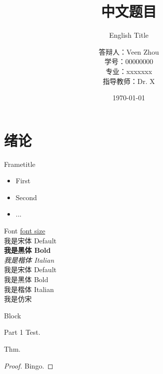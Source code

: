 \documentclass[hyperref,UTF8,11pt,aspectratio=169]{beamer}
\title[Beamer模板]{中文题目}
\subtitle{English Title}
\author[作者]{{\kaishu  答辩人：Veen Zhou\quad \\ 学号：00000000\quad \\专业：xxxxxxx\quad \\ 指导教师：Dr. X\quad \\\quad}}
\institute[学院]{\small 北京林业大学 \quad xxxx学院}
\date[\today \quad \quad \footnotesize\crono]{\today } %
\begin{document}
\newcommand{\redstress}[1]{{\color{red}{#1}}}
\renewcommand{\contentsname}{目录}     %
\renewcommand{\abstractname}{摘要}     %
\renewcommand{\refname}{参考文献}      %
\renewcommand{\indexname}{索引}
\renewcommand{\figurename}{图}
\renewcommand{\tablename}{表}
\renewcommand{\appendixname}{附录}
\begin{frame}
\initclock
\maketitle
\end{frame}

\section{绪论}

\begin{frame}{Frametitle}
    \begin{itemize}
        \item First
        \item Second
        \item ...
    \end{itemize}
\end{frame}

\begin{frame}{Font}
    \href {https://www.overleaf.com/learn/latex/Font_sizes,_families,_and_styles} {font size}\\
    我是宋体 Default\\ 
    \textbf{我是黑体 Bold}\\ 
    \textit{我是楷体 Italian}\\
    {\songti 我是宋体 Default}\\
    {\heiti 我是黑体 Bold}\\
    {\kaishu 我是楷体 Italian}\\
    {\fangsong 我是仿宋}
\end{frame}



\begin{frame}{Block}
    \begin{block}{Part 1}
        Test.
    \end{block}
    \begin{theorem}[Thm 1]
        Thm.
    \end{theorem}
    \begin{proof}
        Bingo.
    \end{proof}
\end{frame}
\end{document}
